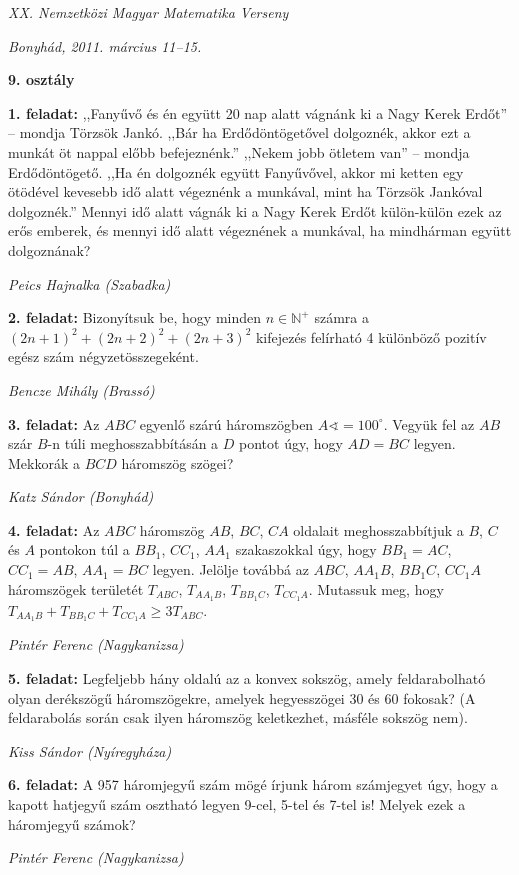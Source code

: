 \documentclass[a4paper,10pt]{article}
\def\ki#1#2{\hfill {\it #1 (#2)}\medskip}
\begin{document}
\begin{center} \Large {\em XX. Nemzetközi Magyar Matematika Verseny} \end{center}
\begin{center} \large{\em Bonyhád, 2011. március 11--15.} \end{center}
\smallskip
\begin{center} \large{\bf 9. osztály} \end{center}
\bigskip 

{\bf 1. feladat: }
,,Fanyűvő és én együtt 20 nap alatt vágnánk ki a Nagy Kerek Erdőt'' -- mondja Törzsök Jankó. ,,Bár ha Erdődöntögetővel dolgoznék, akkor ezt a munkát öt nappal előbb befejeznénk.'' ,,Nekem jobb ötletem van'' -- mondja Erdődöntögető. ,,Ha én dolgoznék együtt Fanyűvővel, akkor mi ketten egy ötödével kevesebb idő alatt végeznénk a munkával, mint ha Törzsök Jankóval dolgoznék.'' Mennyi idő alatt vágnák ki a Nagy Kerek Erdőt külön-külön ezek az erős emberek, és mennyi idő alatt végeznének a munkával, ha mindhárman együtt dolgoznának?

\ki{Peics Hajnalka}{Szabadka}\medskip

{\bf 2. feladat: } 
Bizonyítsuk be, hogy minden $n\in\mathbb{N}^+$ számra a $(2n+1)^2+(2n+2)^2+(2n+3)^2$ kifejezés felírható 4 különböző pozitív egész szám négyzetösszegeként.

\ki{Bencze Mihály}{Brassó}\medskip

{\bf 3. feladat: } 
Az $ABC$ egyenlő szárú háromszögben $A\sphericalangle=100^\circ$. Vegyük fel az $AB$ szár $B$-n túli meghosszabbításán a $D$ pontot úgy, hogy $AD=BC$ legyen. Mekkorák a $BCD$ háromszög szögei?

\ki{Katz Sándor}{Bonyhád}\medskip

{\bf 4. feladat: } 
Az $ABC$ háromszög $AB$, $BC$, $CA$ oldalait meghosszabbítjuk a $B$, $C$ és $A$ pontokon túl a $BB_1$, $CC_1$, $AA_1$ szakaszokkal úgy, hogy $BB_1=AC$, $CC_1=AB$, $AA_1=BC$ legyen. Jelölje továbbá az $ABC$, $AA_1B$, $BB_1C$, $CC_1A$ háromszögek területét $T_{ABC}$, $T_{AA_1B}$, $T_{BB_1C}$, $T_{CC_1A}$. Mutassuk meg, hogy $T_{AA_1B}+T_{BB_1C}+T_{CC_1A}\ge3T_{ABC}$.

\ki{Pintér Ferenc}{Nagykanizsa}\medskip

{\bf 5. feladat: } 
Legfeljebb hány oldalú az a konvex sokszög, amely feldarabolható olyan derékszögű háromszögekre, amelyek hegyesszögei 30 és 60 fokosak? (A feldarabolás során csak ilyen háromszög keletkezhet, másféle sokszög nem).

\ki{Kiss Sándor}{Nyíregyháza}\medskip

{\bf 6. feladat: } 
A 957 háromjegyű szám mögé írjunk három számjegyet úgy, hogy a kapott hatjegyű szám osztható legyen 9-cel, 5-tel és 7-tel is! Melyek ezek a háromjegyű számok?

\ki{Pintér Ferenc}{Nagykanizsa}\medskip

\vfill
\end{document}
